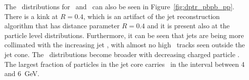 
The \Dptr\ distributions for \pp\ and \pbpb\ can also be seen in Figure~\ref{fig:dptr_pbpb_pp}. There is a kink at $R = 0.4$, which is an artifact of the jet reconstruction algorithm that has distance parameter $R = 0.4$  \cite{Choudalakis:1248716} and it is present also at the particle level distributions. Furthermore, it can be seen that jets are being more collimated with the increasing jet \pt, with almost no high \pt\ tracks seen outside the jet cone. The \Dptr\ distributions become broader with decreasing charged particle \pT. The largest fraction of particles in the jet core carries \pT\ in the interval between 4 and 6~GeV.  

\begin{figure}
\end{figure}
